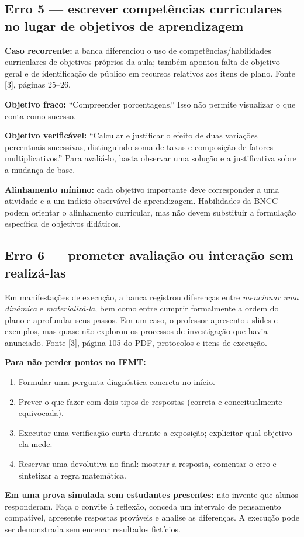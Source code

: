 \documentclass[11pt,a4paper]{article}
\begin{document}
\subsection{Erro 5 --- escrever competências curriculares no lugar de objetivos de aprendizagem}
\textbf{Caso recorrente:} a banca diferenciou o uso de competências/habilidades curriculares de objetivos próprios da aula; também apontou falta de objetivo geral e de identificação de público em recursos relativos aos itens de plano. Fonte [3], páginas 25--26.

\textbf{Objetivo fraco:} ``Compreender porcentagens.'' Isso não permite visualizar o que conta como sucesso.

\textbf{Objetivo verificável:} ``Calcular e justificar o efeito de duas variações percentuais sucessivas, distinguindo soma de taxas e composição de fatores multiplicativos.'' Para avaliá-lo, basta observar uma solução e a justificativa sobre a mudança de base.

\textbf{Alinhamento mínimo:} cada objetivo importante deve corresponder a uma atividade e a um indício observável de aprendizagem. Habilidades da BNCC podem orientar o alinhamento curricular, mas não devem substituir a formulação específica de objetivos didáticos.

\subsection{Erro 6 --- prometer avaliação ou interação sem realizá-las}
Em manifestações de execução, a banca registrou diferenças entre \textit{mencionar uma dinâmica} e \textit{materializá-la}, bem como entre cumprir formalmente a ordem do plano e aprofundar seus passos. Em um caso, o professor apresentou slides e exemplos, mas quase não explorou os processos de investigação que havia anunciado. Fonte [3], página 105 do PDF, protocolos e itens de execução.

\textbf{Para não perder pontos no IFMT:}
\begin{enumerate}
\item Formular uma pergunta diagnóstica concreta no início.
\item Prever o que fazer com dois tipos de respostas (correta e conceitualmente equivocada).
\item Executar uma verificação curta durante a exposição; explicitar qual objetivo ela mede.
\item Reservar uma devolutiva no final: mostrar a resposta, comentar o erro e sintetizar a regra matemática.
\end{enumerate}
\textbf{Em uma prova simulada sem estudantes presentes:} não invente que alunos responderam. Faça o convite à reflexão, conceda um intervalo de pensamento compatível, apresente respostas prováveis e analise as diferenças. A execução pode ser demonstrada sem encenar resultados fictícios.
\end{document}
